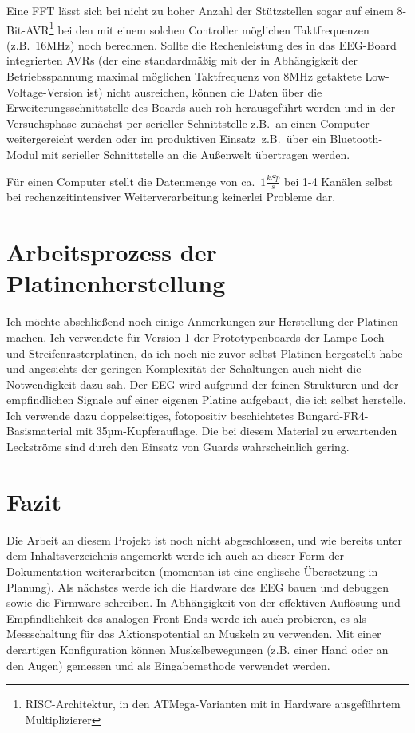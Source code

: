 \documentclass[12pt,a4paper,notitlepage]{article}
\begin{document}
Eine FFT lässt sich bei nicht zu hoher Anzahl der Stützstellen sogar auf einem 8-Bit-AVR\footnote{RISC-Architektur, in den \glqq ATMega\grqq-Varianten mit in Hardware ausgeführtem Multiplizierer} bei den mit einem solchen Controller möglichen Taktfrequenzen (z.B.\ 16MHz) noch berechnen\cite{LOMBARD1}. Sollte die Rechenleistung des in das EEG-Board integrierten AVRs (der eine standardmäßig mit der in Abhängigkeit der Betriebsspannung maximal möglichen Taktfrequenz von 8MHz getaktete Low-Voltage-Version ist) nicht ausreichen, können die Daten über die Erweiterungsschnittstelle des Boards auch roh herausgeführt werden und in der Versuchsphase zunächst per serieller Schnittstelle z.B.\ an einen Computer weitergereicht werden oder im \glqq produktiven Einsatz\grqq\ z.B.\ über ein Bluetooth-Modul mit serieller Schnittstelle an die Außenwelt übertragen werden.

Für einen Computer stellt die Datenmenge von ca.\ $1\frac{kSp}{s}$ bei 1-4 Kanälen selbst bei rechenzeitintensiver Weiterverarbeitung keinerlei Probleme dar.

\section{Arbeitsprozess der Platinenherstellung}
Ich möchte abschließend noch einige Anmerkungen zur Herstellung der Platinen machen. Ich verwendete für Version 1 der Prototypenboards der Lampe Loch- und Streifenrasterplatinen, da ich noch nie zuvor selbst Platinen hergestellt habe und angesichts der geringen Komplexität der Schaltungen auch nicht die Notwendigkeit dazu sah. Der EEG wird aufgrund der feinen Strukturen und der empfindlichen Signale auf einer eigenen Platine aufgebaut, die ich selbst herstelle. Ich verwende dazu doppelseitiges, fotopositiv beschichtetes Bungard-FR4-Basismaterial mit 35µm-Kupferauflage. Die bei diesem Material zu erwartenden Leckströme sind durch den Einsatz von Guards wahrscheinlich gering\cite{BUNGARD1,ANALOG1,ANALOG2,MAXIM56,MAXIM55,MAXIM52}.

\section{Fazit}
Die Arbeit an diesem Projekt ist noch nicht abgeschlossen, und wie bereits unter dem Inhaltsverzeichnis angemerkt werde ich auch an dieser Form der Dokumentation weiterarbeiten (momentan ist eine englische Übersetzung in Planung). Als nächstes werde ich die Hardware des \gls{EEG} bauen und debuggen sowie die Firmware schreiben. In Abhängigkeit von der effektiven Auflösung und Empfindlichkeit des analogen Front-Ends werde ich auch probieren, es als Messschaltung für das Aktionspotential an Muskeln zu verwenden. Mit einer derartigen Konfiguration können Muskelbewegungen (z.B. einer Hand oder an den Augen) gemessen und als Eingabemethode verwendet werden\cite{WP21,MULDER1}.
\end{document}
